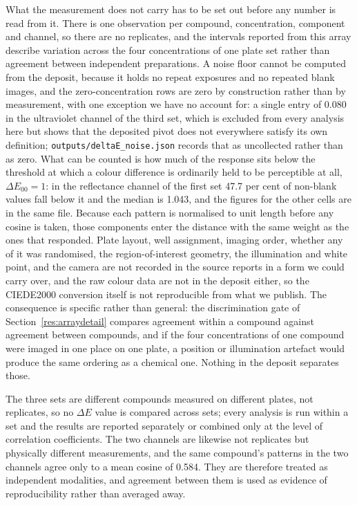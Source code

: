 \documentclass[11pt,a4paper]{article}
\begin{document}
What the measurement does not carry has to be set out before any number is
read from it. There is one observation per compound, concentration, component
and channel, so there are no replicates, and the intervals reported from this
array describe variation across the four concentrations of one plate set rather
than agreement between independent preparations. A noise floor cannot be
computed from the deposit, because it holds no repeat exposures and no repeated
blank images, and the zero-concentration rows are zero by construction rather
than by measurement, with one exception we have no account for: a single
entry of 0.080 in the ultraviolet channel of the third set, which is excluded
from every analysis here but shows that the deposited pivot does not everywhere
satisfy its own definition; \texttt{outputs/deltaE\_noise.json} records that as
uncollected rather than as zero. What can be counted is how much of the
response sits below the threshold at which a colour difference is ordinarily
held to be perceptible at all, $\Delta E_{00} = 1$: in the reflectance channel
of the first set 47.7 per cent of non-blank values fall below it and the median
is 1.043, and the figures for the other cells are in the same file. Because
each pattern is normalised to unit length before any cosine is taken, those
components enter the distance with the same weight as the ones that responded.
Plate layout, well assignment, imaging order, whether any of it was randomised,
the region-of-interest geometry, the illumination and white point, and the
camera are not recorded in the source reports in a form we could carry over,
and the raw colour data are not in the deposit either, so the CIEDE2000
conversion itself is not reproducible from what we publish. The consequence is
specific rather than general: the discrimination gate of
Section~\ref{res:arraydetail} compares agreement within a compound against
agreement between compounds, and if the four concentrations of one compound
were imaged in one place on one plate, a position or illumination artefact
would produce the same ordering as a chemical one. Nothing in the deposit
separates those.

The three sets are different compounds measured on different plates, not
replicates, so no $\Delta E$ value is compared across sets; every analysis is run
within a set and the results are reported separately or combined only at the
level of correlation coefficients. The two channels are likewise not replicates
but physically different measurements, and the same compound's patterns in the
two channels agree only to a mean cosine of 0.584. They are therefore treated as
independent modalities, and agreement between them is used as evidence of
reproducibility rather than averaged away.
\end{document}

